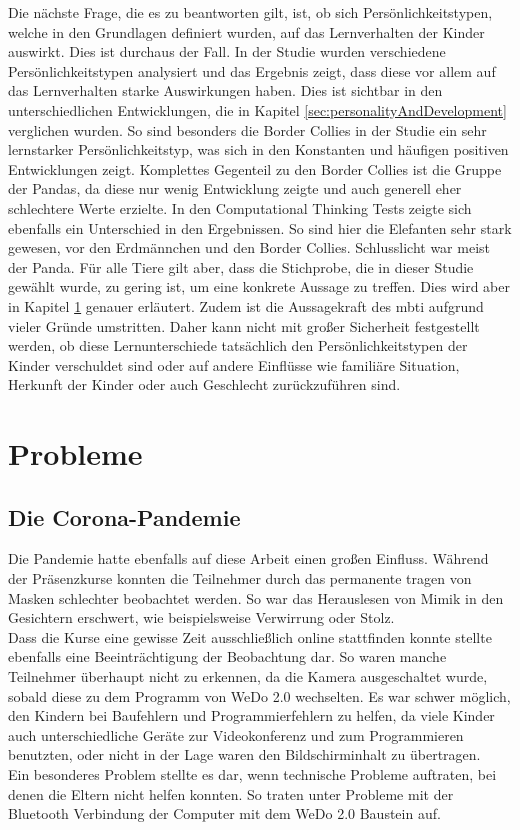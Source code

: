 Die nächste Frage, die es zu beantworten gilt, ist, ob sich Persönlichkeitstypen, welche in den Grundlagen definiert wurden, auf das Lernverhalten der Kinder auswirkt. Dies ist durchaus der Fall. In der Studie wurden verschiedene Persönlichkeitstypen analysiert und das Ergebnis zeigt, dass diese vor allem auf das Lernverhalten starke Auswirkungen haben. Dies ist sichtbar in den unterschiedlichen Entwicklungen, die in Kapitel \ref{sec:personalityAndDevelopment} verglichen wurden. So sind besonders die Border Collies in der Studie ein sehr lernstarker Persönlichkeitstyp, was sich in den Konstanten und häufigen positiven Entwicklungen zeigt. Komplettes Gegenteil zu den Border Collies ist die Gruppe der Pandas, da diese nur wenig Entwicklung zeigte und auch generell eher schlechtere Werte erzielte. In den Computational Thinking Tests zeigte sich ebenfalls ein Unterschied in den Ergebnissen. So sind hier die Elefanten sehr stark gewesen, vor den Erdmännchen und den Border Collies. Schlusslicht war meist der Panda. Für alle Tiere gilt aber, dass die Stichprobe, die in dieser Studie gewählt wurde, zu gering ist, um eine konkrete Aussage zu treffen. Dies wird aber in Kapitel \ref{sec:problems} genauer erläutert. Zudem ist die Aussagekraft des \acrlong{mbti} aufgrund vieler Gründe umstritten. Daher kann nicht mit großer Sicherheit festgestellt werden, ob diese Lernunterschiede tatsächlich den Persönlichkeitstypen der Kinder verschuldet sind oder auf andere Einflüsse wie familiäre Situation, Herkunft der Kinder oder auch Geschlecht zurückzuführen sind.


\section{Probleme}\label{sec:problems}
\subsection{Die Corona-Pandemie}
Die Pandemie hatte ebenfalls auf diese Arbeit einen großen Einfluss. Während der Präsenzkurse konnten die Teilnehmer durch das permanente tragen von Masken schlechter beobachtet werden. So war das Herauslesen von Mimik in den Gesichtern erschwert, wie beispielsweise Verwirrung oder Stolz. \\
Dass die Kurse eine gewisse Zeit ausschließlich online stattfinden konnte stellte ebenfalls eine Beeinträchtigung der Beobachtung dar. So waren manche Teilnehmer überhaupt nicht zu erkennen, da die Kamera ausgeschaltet wurde, sobald diese zu dem Programm von WeDo 2.0 wechselten. Es war schwer möglich, den Kindern bei Baufehlern und Programmierfehlern zu helfen, da viele Kinder auch unterschiedliche Geräte zur Videokonferenz und zum Programmieren benutzten, oder nicht in der Lage waren den Bildschirminhalt zu übertragen.\\
Ein besonderes Problem stellte es dar, wenn technische Probleme auftraten, bei denen die Eltern nicht helfen konnten. So traten unter  Probleme mit der Bluetooth Verbindung der Computer mit dem WeDo 2.0 Baustein auf.

